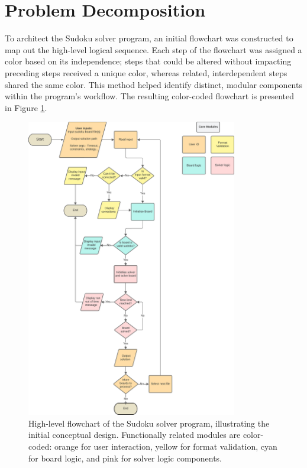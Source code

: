 \documentclass[11pt]{article}
\begin{document}
\section{Problem Decomposition}
To architect the Sudoku solver program, an initial flowchart was constructed to map out the high-level logical sequence. Each step of the flowchart was assigned a color based on its independence; steps that could be altered without impacting preceding steps received a unique color, whereas related, interdependent steps shared the same color. This method helped identify distinct, modular components within the program's workflow. The resulting color-coded flowchart is presented in Figure \ref{fig:solver_flowchart}.
\begin{figure}[H]
\centering
\includegraphics[width=0.82\textwidth]{figs/solver_flowchart.png}
\caption{High-level flowchart of the Sudoku solver program, illustrating the initial conceptual design. Functionally related modules are color-coded: orange for user interaction, yellow for format validation, cyan for board logic, and pink for solver logic components.}
\label{fig:solver_flowchart}
\end{figure}
\end{document}
